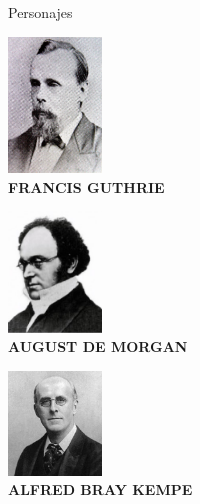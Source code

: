 \documentclass[spanish,utf8]{beamer}
\begin{document}
\begin{frame}{Personajes}
\centering
\begin{minipage}[c]{3cm}
\includegraphics[width=2.5cm]{Francis_guthrie} \\
\centering \bf{FRANCIS GUTHRIE}
\end{minipage}
\begin{minipage}[c]{4cm}
\includegraphics[width=2.5cm]{morgan.jpg}\\
\centering\bf{AUGUST DE MORGAN}
\end{minipage}
\begin{minipage}[c]{3cm}
\includegraphics[width=2.5cm]{kempe.jpeg}\\
\centering\bf{ALFRED BRAY KEMPE}
\end{minipage}
\end{frame}
\end{document}
